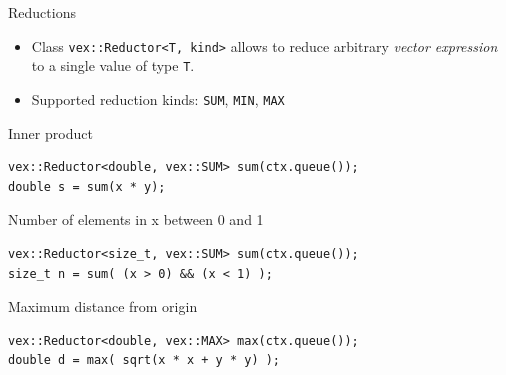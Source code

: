 \documentclass[@BEAMER_OPTIONS@]{beamer}
\newcommand{\code}[1]{\lstinline|#1|}
\begin{document}
\begin{frame}[fragile]{Reductions}
    \begin{itemize}
        \item Class \code{vex::Reductor<T, kind>} allows to reduce arbitrary
            \emph{vector expression} to a single value of type \code{T}.
        \item Supported reduction kinds: \code{SUM}, \code{MIN}, \code{MAX}
    \end{itemize}
    \begin{exampleblock}{Inner product}
        \begin{lstlisting}
vex::Reductor<double, vex::SUM> sum(ctx.queue());
double s = sum(x * y);
        \end{lstlisting}
    \end{exampleblock}
    \begin{exampleblock}{Number of elements in x between 0 and 1}
        \begin{lstlisting}
vex::Reductor<size_t, vex::SUM> sum(ctx.queue());
size_t n = sum( (x > 0) && (x < 1) );
        \end{lstlisting}
    \end{exampleblock}
    \begin{exampleblock}{Maximum distance from origin}
        \begin{lstlisting}
vex::Reductor<double, vex::MAX> max(ctx.queue());
double d = max( sqrt(x * x + y * y) );
        \end{lstlisting}
    \end{exampleblock}
\end{frame}

\end{document}
